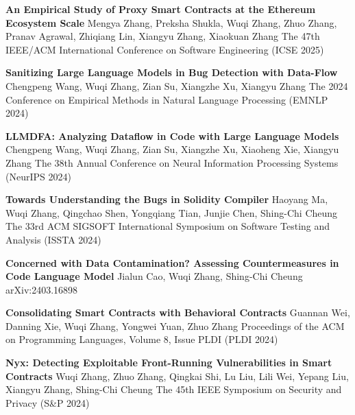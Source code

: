 %
%
%


\begin{scholarship}
	{\textbf{An Empirical Study of Proxy Smart Contracts at the Ethereum Ecosystem Scale}}
	{Mengya Zhang, Preksha Shukla, Wuqi Zhang, Zhuo Zhang, Pranav Agrawal, Zhiqiang Lin, Xiangyu Zhang, Xiaokuan Zhang}
	\scholarshipentry{}
	{The 47th IEEE/ACM International Conference on Software Engineering (ICSE 2025)}

	{\textbf{Sanitizing Large Language Models in Bug Detection with Data-Flow}}
	{Chengpeng Wang, Wuqi Zhang, Zian Su, Xiangzhe Xu, Xiangyu Zhang}
	\scholarshipentry{}
	{The 2024 Conference on Empirical Methods in Natural Language Processing (EMNLP 2024)}

	{\textbf{LLMDFA: Analyzing Dataflow in Code with Large Language Models}}
	{Chengpeng Wang, Wuqi Zhang, Zian Su, Xiangzhe Xu, Xiaoheng Xie, Xiangyu Zhang}
	\scholarshipentry{}
	{The 38th Annual Conference on Neural Information Processing Systems (NeurIPS 2024)}

	{\textbf{Towards Understanding the Bugs in Solidity Compiler}}
	{Haoyang Ma, Wuqi Zhang, Qingchao Shen, Yongqiang Tian, Junjie Chen, Shing-Chi Cheung}
	\scholarshipentry{}
	{The 33rd ACM SIGSOFT International Symposium on Software Testing and Analysis (ISSTA 2024)}

	{\textbf{Concerned with Data Contamination? Assessing Countermeasures in Code Language Model}}
	{Jialun Cao, Wuqi Zhang, Shing-Chi Cheung}
	\scholarshipentry{}
	{arXiv:2403.16898}

	{\textbf{Consolidating Smart Contracts with Behavioral Contracts}}
	{Guannan Wei, Danning Xie, Wuqi Zhang, Yongwei Yuan, Zhuo Zhang}
	\scholarshipentry{}
	{Proceedings of the ACM on Programming Languages, Volume 8, Issue PLDI (PLDI 2024)}

	{\textbf{Nyx: Detecting Exploitable Front-Running Vulnerabilities in Smart Contracts}}
	{Wuqi Zhang, Zhuo Zhang, Qingkai Shi, Lu Liu, Lili Wei, Yepang Liu, Xiangyu Zhang, Shing-Chi Cheung}
	\scholarshipentry{}
	{The 45th IEEE Symposium on Security and Privacy (S\&P 2024)}


\end{scholarship}
